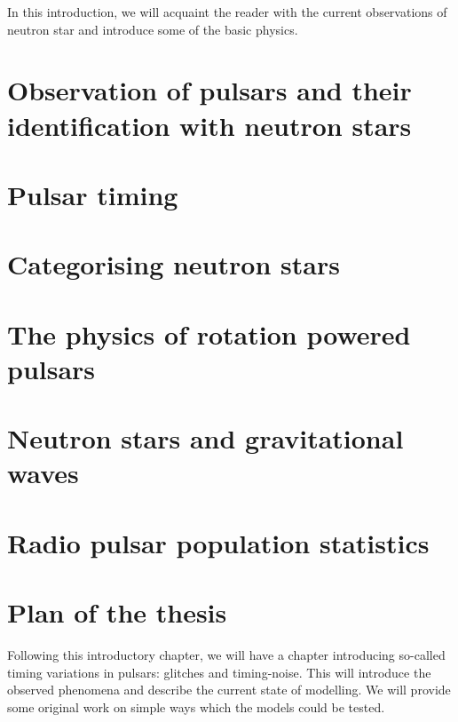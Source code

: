 \documentclass[../full_thesis/full_thesis.tex]{subfiles}
\newcommand{\thisdir}{../introduction}
\begin{document}
In this introduction, we will acquaint the reader with the current observations
of neutron star and introduce some of the basic physics.

\section{Observation of pulsars and their identification with neutron stars}


\section{Pulsar timing}
\label{sec: pulsar timing methods}


\section{Categorising neutron stars}
\label{sec: categorising neutron stars}


\section{The physics of rotation powered pulsars} 
\label{sec: rotation powered pulsars}


\section{Neutron stars and gravitational waves}
\label{sec: gravitational waves}


\section{Radio pulsar population statistics}
\label{sec: population stats}



\section{Plan of the thesis}

Following this introductory chapter, we will have a chapter introducing
so-called timing variations in pulsars: glitches and timing-noise. This will
introduce the observed phenomena and describe the current state of modelling.
We will provide some original work on simple ways which the models could be
tested.
\end{document}

